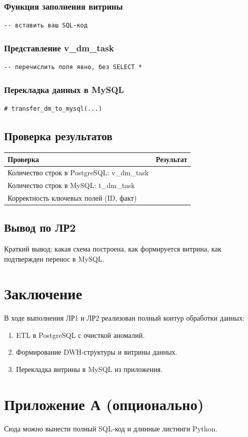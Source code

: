 \documentclass[14pt,a4paper]{extarticle}
\begin{document}
\subsubsection{Функция заполнения витрины}
\begin{lstlisting}[style=sqlstyle,caption={Фрагмент fn_dm_data_load}]
-- вставить ваш SQL-код
\end{lstlisting}

\subsubsection{Представление v_dm_task}
\begin{lstlisting}[style=sqlstyle,caption={Создание v_dm_task}]
-- перечислить поля явно, без SELECT *
\end{lstlisting}

\subsubsection{Перекладка данных в MySQL}
\begin{lstlisting}[style=pystyle,caption={Функция переноса в MySQL}]
# transfer_dm_to_mysql(...)
\end{lstlisting}

\subsection{Проверка результатов}
\begin{longtable}{|p{}|p{}|}
\hline
Проверка & Результат \\ \hline
Количество строк в PostgreSQL: v\_dm\_task & \\ \hline
Количество строк в MySQL: t\_dm\_task & \\ \hline
Корректность ключевых полей (ID, факт) & \\ \hline
\end{longtable}

\subsection{Вывод по ЛР2}
Краткий вывод: какая схема построена, как формируется витрина, как подтвержден перенос в MySQL.

\newpage
\section*{Заключение}
В ходе выполнения ЛР1 и ЛР2 реализован полный контур обработки данных:
\begin{enumerate}
    \item ETL в PostgreSQL с очисткой аномалий.
    \item Формирование DWH-структуры и витрины данных.
    \item Перекладка витрины в MySQL из приложения.
\end{enumerate}

\section*{Приложение А (опционально)}
Сюда можно вынести полный SQL-код и длинные листинги Python.
\end{document}
